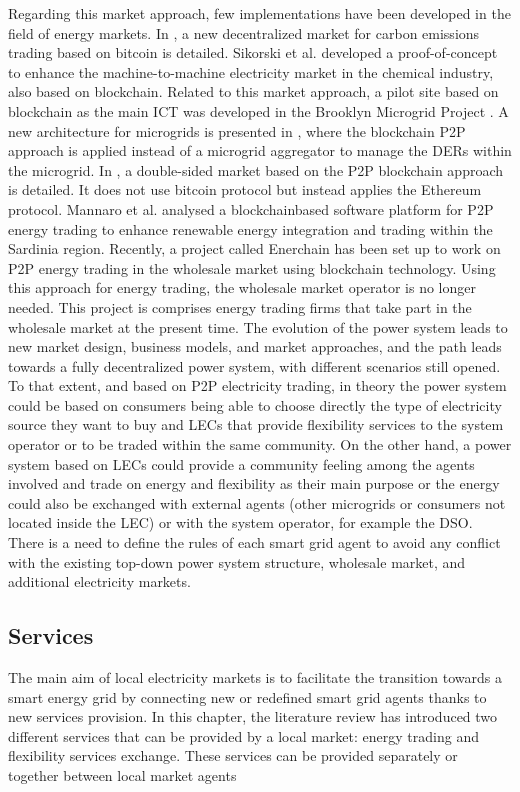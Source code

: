 Regarding this market approach, few implementations have been developed in the field of energy markets. In \cite{al2015bitcoin}, a new decentralized market for carbon emissions trading based on bitcoin is detailed. Sikorski et al. \cite{sikorski2017blockchain} developed a proof-of-concept to enhance the machine-to-machine electricity market in the chemical industry, also based on blockchain. Related to this market approach, a pilot site based on blockchain as the main ICT was developed in the Brooklyn Microgrid Project \cite{mengelkamp2018designing}. A new architecture for microgrids is presented in \cite{munsing2017blockchains}, where the blockchain P2P approach is applied instead of a microgrid aggregator to manage the DERs within the microgrid. In \cite{mengelkamp2018blockchain}, a double-sided market based on the P2P blockchain approach is detailed. It does not use bitcoin protocol but instead applies the Ethereum protocol. Mannaro et al. \cite{mannaro2017crypto} analysed a blockchainbased software platform for P2P energy trading to enhance renewable energy integration and trading within the Sardinia region. Recently, a project called Enerchain \cite{Enerchain} has been set up to work on P2P energy trading in the wholesale market using blockchain technology. Using this approach for energy trading, the wholesale market operator is no longer needed. This project is comprises energy trading firms that take part in the wholesale market at the present time. The evolution of the power system leads to new market design, business models, and market approaches, and the path leads towards a fully decentralized power system, with different scenarios still opened. To that extent, and based on P2P electricity trading, in theory the power system could be based on consumers being able to choose directly the type of electricity source they want to buy and LECs that provide flexibility services to the system operator or to be traded within the same community. On the other hand, a power system based on LECs could provide a community feeling among the agents involved and trade on energy and flexibility as their main purpose or the energy could also be exchanged with external agents (other microgrids or consumers not located inside the LEC) or with the system operator, for example the DSO. There is a need to define the rules of each smart grid agent to avoid any conflict with the existing top-down power system structure, wholesale market, and additional electricity markets.


\subsection{Services} \label{sec:services}
The main aim of local electricity markets is to facilitate the transition towards a smart energy grid by connecting new or redefined smart grid agents thanks to new services provision. In this chapter, the literature review has introduced two different services that can be provided by a local market: energy trading and flexibility services exchange. These services can be provided separately or together between local market agents 

